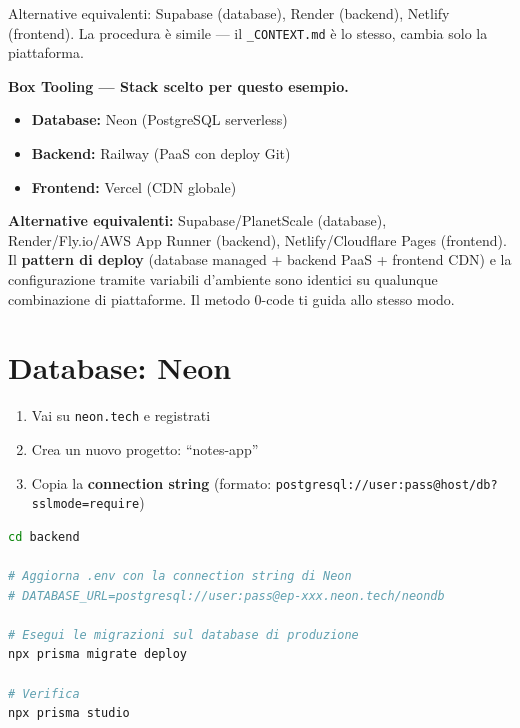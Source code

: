 \begin{tipbox}
Alternative equivalenti: Supabase (database), Render (backend), Netlify (frontend). La procedura è simile --- il \texttt{\_CONTEXT.md} è lo stesso, cambia solo la piattaforma.
\end{tipbox}
\begin{notebox}
\textbf{Box Tooling --- Stack scelto per questo esempio.}
\begin{itemize}
  \item \textbf{Database:} Neon (PostgreSQL serverless)
  \item \textbf{Backend:} Railway (PaaS con deploy Git)
  \item \textbf{Frontend:} Vercel (CDN globale)
\end{itemize}
\textbf{Alternative equivalenti:} Supabase/PlanetScale (database), Render/Fly.io/AWS App Runner (backend), Netlify/Cloudflare Pages (frontend). Il \textbf{pattern di deploy} (database managed + backend PaaS + frontend CDN) e la configurazione tramite variabili d'ambiente sono identici su qualunque combinazione di piattaforme. Il metodo 0-code ti guida allo stesso modo.
\end{notebox}
\section{Database: Neon}

\begin{praticabox}[title={Pratica --- Setup Neon}]
\begin{enumerate}
  \item Vai su \texttt{neon.tech} e registrati
  \item Crea un nuovo progetto: ``notes-app''
  \item Copia la \textbf{connection string} (formato: \texttt{postgresql://user:pass@host/db?sslmode=require})
\end{enumerate}
\end{praticabox}

\begin{praticabox}[title={Pratica --- Migra lo schema}]
\begin{lstlisting}[language=bash]
cd backend

# Aggiorna .env con la connection string di Neon
# DATABASE_URL=postgresql://user:pass@ep-xxx.neon.tech/neondb

# Esegui le migrazioni sul database di produzione
npx prisma migrate deploy

# Verifica
npx prisma studio
\end{lstlisting}
\end{praticabox}

